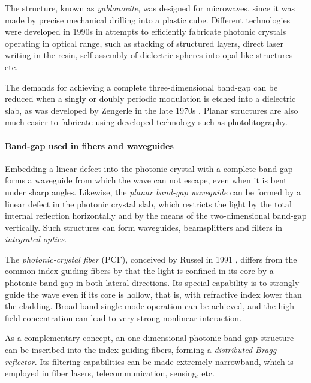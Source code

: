 The structure, known as \textit{yablonovite}, was designed for microwaves, since it was made by precise mechanical drilling into a plastic cube. Different technologies were developed in 1990s in attempts to efficiently fabricate photonic crystals operating in optical range, such as stacking of structured layers, direct laser writing in the resin,  self-assembly of dielectric spheres into opal-like structures etc. 

The demands for achieving a complete three-dimensional band-gap can be reduced when a singly or doubly periodic modulation is etched into a dielectric slab, as was developed by Zengerle in the late 1970s \cite{zengerle1987light}. Planar structures are also much easier to fabricate using developed technology such as photolitography. 
\cite{joannopoulos2011photonic}

\paragraph{Band-gap used in fibers and waveguides} %
Embedding a linear defect into the photonic crystal with a complete band gap forms a waveguide from which the wave can not escape, even when it is bent under sharp angles.
Likewise, the \textit{planar band-gap waveguide} can be formed by a linear defect in the photonic crystal slab, which restricts the light by the total internal reflection horizontally and by the means of the two-dimensional band-gap vertically. Such structures can form waveguides, beamsplitters and filters in \textit{integrated optics}. 

The \textit{photonic-crystal fiber} (PCF), conceived by Russel in 1991 \cite{russell2007photonic}, differs from the common index-guiding fibers by that the light is confined in its core by a photonic band-gap in both lateral directions. 
Its special capability is to strongly guide the wave even if its core is hollow, that is, with refractive index lower than the cladding. Broad-band single mode operation can be achieved, and the high field concentration can lead to very strong nonlinear interaction.

As a complementary concept, an one-dimensional photonic band-gap structure can be inscribed into the index-guiding fibers, forming a \textit{distributed Bragg reflector}. Its filtering capabilities can be made extremely narrowband, which is employed in fiber lasers, telecommunication, sensing, etc. %

